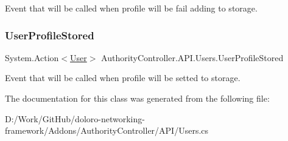 Event that will be called when profile will be fail adding to storage. 

\mbox{\label{class_authority_controller_1_1_a_p_i_1_1_users_a38d89296f7a63c029fe5873e12451ce3}} 
\subsubsection{\texorpdfstring{User\+Profile\+Stored}{UserProfileStored}}
{\footnotesize\ttfamily System.\+Action$<$\mbox{\hyperlink{class_authority_controller_1_1_data_1_1_personal_1_1_user}{User}}$>$ Authority\+Controller.\+A\+P\+I.\+Users.\+User\+Profile\+Stored\hspace{0.3cm}{\ttfamily [static]}}



Event that will be called when profile will be setted to storage. 



The documentation for this class was generated from the following file\+:\begin{DoxyCompactItemize}
\item 
D\+:/\+Work/\+Git\+Hub/doloro-\/networking-\/framework/\+Addons/\+Authority\+Controller/\+A\+P\+I/Users.\+cs\end{DoxyCompactItemize}
